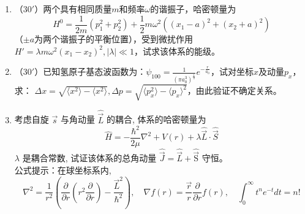 \begin{enumerate}
\banswer{
	
}


\newpage


\item 
（$30'$）两个具有相同质量$m$和频率$\omega$的谐振子，哈密顿量为
$$H^0=\frac{1}{2m}(p_1^2+p_2^2)+\frac{1}{2}m\omega^2((x_1-a)^2+(x_2+a)^2)$$
（$\pm a$为两个谐振子的平衡位置），受到微扰作用$H'=\lambda m\omega^2(x_1-x_2)^2,|\lambda|\ll1$，试求该体系的能级。


\banswer{
	
}


\item 
（$30'$）已知氢原子基态波函数为：$\psi_{100}=\frac{1}{(\pi a_0^3)^{\frac{1}{2}}}e^{-\frac{r}{a_0}}$，试对坐标$x$及动量$p_x$，求：
$\Delta x=\sqrt{\langle x^2\rangle-\langle x^2\rangle},\Delta p=\sqrt{\langle p_x^2\rangle-\langle p_x\rangle^2}$，由此验证不确定关系。

\banswer{
	
}


\item 
考虑自旋 $\vec{s}$ 与角动量 $\hat{\vec{L}}$ 的耦合, 体系的哈密顿量为
\[
\hat{H}=-\frac{\hbar^{2}}{2 \mu} \nabla^{2}+V(r)+\lambda \hat{\vec{L}} \cdot \hat{\vec{S}}
\]
$\lambda$ 是耦合常数, 试证该体系的总角动量 $\hat{\vec{J}}=\hat{\vec{L}}+\hat{\overrightarrow{\mathrm{S}}}$ 守恒。\\
公式提示：在球坐标系内,
\[ 
\nabla^{2}=\frac{1}{r^{2}}\left(\frac{\partial}{\partial r}\left(r^{2} \frac{\partial}{\partial r}\right)-\frac{\vec{L}^{2}}{\hbar^{2}}\right), \quad \nabla f(r)=\frac{\vec{r}}{r} \frac{\partial}{\partial r} f(r), \quad \int_{0}^{\infty} t^{n} e^{-t} d t=n !
 \]

\banswer{
	
}


\end{enumerate}


